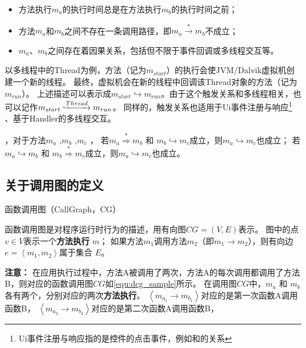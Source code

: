 	\begin{itemize}
		\setlength{\itemsep}{-5pt}
		\item  方法执行$m_a$的执行时间总是在方法执行$m_b$的执行时间之前；
		\item 方法$m_a$和$m_b$之间不存在一条调用路径，即$m_a \stackrel{\ast}{\to} m_b $不成立；
		\item $m_a$、$m_b$之间存在着因果关系，包括但不限于事件回调或多线程交互等。
	\end{itemize}


以多线程中的Thread为例，方法（记为$m_{start}$）的执行会使JVM/Dalvik虚拟机创建一个新的线程。
最终，虚拟机会在新的线程中回调该Thread对象的方法（记为$m_{run}$）。
上述描述可以表示成$m_{start} \hookrightarrow m_{run}$。由于这个触发关系和多线程相关，也可以记作$m_{start} \lhook\joinrel\xrightarrow{Thread}  m_{run} $。
同样的，触发关系也适用于Ui事件注册与响应\footnote{Ui事件注册与响应指的是控件的点击事件，例如和的关系} 、基于Handler的多线程交互。


，对于方法$m_a$ ,$m_b$ ,$m_c$ ，
若$m_a  \stackrel{\ast}{ \Rightarrow } m_b$ 和 $m_b \hookrightarrow m_c$成立，则$m_a \hookrightarrow m_c$也成立；
若$m_a  \hookrightarrow m_b$ 和 $m_b \stackrel{\ast}{ \Rightarrow }  m_c$成立，则$m_a \hookrightarrow m_c$也成立。

\subsection{关于调用图的定义}

\begin{Def}
	函数调用图（CallGraph，CG）
\end{Def}	

	函数调用图是对程序运行时行为的描述，用有向图$CG = ( V , E)$表示。 图中的点$ v \in V $表示一个\textbf{方法执行} $m$；
	如果方法$m_1$调用方法$m_2$（即$m_1 \to m_2$），则有向边 $e = \left\langle m_1 ,m_2 \right\rangle $属于集合 $E$。 


\textbf{注意：}
在应用执行过程中，方法A被调用了两次，方法A的每次调用都调用了方法B，则对应的函数调用图$CG$如\autoref{equ:dcg_sample}所示。
在调用图$CG$中，$m_a$ 和 $m_b$ 各有两个，分别对应的两次\textbf{方法执行}。
$\left\langle m_{a_{1}} \to m_{b_{1}}\right\rangle $对应的是第一次函数A调用函数B，
$\left\langle m_{a_{2}} \to m_{b_{2}} \right\rangle    $对应的是第二次函数A调用函数B，

